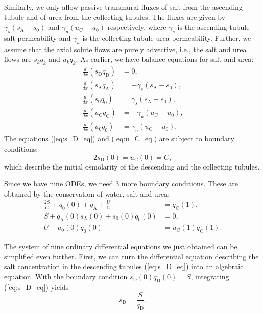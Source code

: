 \documentclass{article}
\numberwithin{equation}{section} %
\begin{document}
Similarly, we only allow passive transmural fluxes of salt from the ascending tubule and of urea from the collecting tubules.
The fluxes are given by $\gamma_s(s_\mathrm{A} - s_0)$ and $\gamma_u(u_\mathrm{C} - u_0)$ respectively, where $\gamma_s$ is the ascending tubule salt permeability and $\gamma_u$ is the collecting tubule urea permeability.
Further, we assume that the axial solute flows are purely advective, i.e., the salt and urea flows are $s_kq_k$ and $u_kq_k$.
As earlier, we have balance equations for salt and urea:
\begin{align}
    \frac{d}{dx}(s_\mathrm{D}q_\mathrm{D}) &= 0,\label{eq:s_D_eq}\\
    \frac{d}{dx}(s_\mathrm{A}q_\mathrm{A}) &= -\gamma_s(s_\mathrm{A} - s_0),\label{eq:s_A_eq}\\
    \frac{d}{dx}(s_\mathrm{0}q_\mathrm{0}) &= \gamma_s(s_\mathrm{A} - s_0),\label{eq:s_0_eq}\\
    \frac{d}{dx}(u_\mathrm{C}q_\mathrm{C}) &= -\gamma_u(u_\mathrm{C} - u_0),\label{eq:u_C_eq}\\
    \frac{d}{dx}(u_\mathrm{0}q_\mathrm{0}) &= \gamma_u(u_\mathrm{C} - u_0).\label{eq:u_0_eq}
\end{align}
The equations (\ref{eq:s_D_eq}) and (\ref{eq:u_C_eq}) are subject to boundary conditions:
\begin{equation}\label{eq:solute_bdry}
    2s_\mathrm{D}(0) = u_\mathrm{C}(0) = C,
\end{equation}
    which describe the initial osmolarity of the descending and the collecting tubules.

Since we have nine ODEs, we need 3 more boundary conditions.
These are obtained by the conservation of water, salt and urea:
\begin{align}
    \frac{2S}{C}+q_0(0)+q_\mathrm{A}+\frac{U}{C} &= q_\mathrm{C}(1),\label{eq:w_consv}\\
    S+q_\mathrm{A}(0)s_\mathrm{A}(0)+s_0(0)q_0(0) &= 0,\label{eq:s_consv}\\
    U+u_0(0)q_0(0) &= u_\mathrm{C}(1)q_\mathrm{C}(1).\label{eq:u_consv}
\end{align}

The system of nine ordinary differential equations we just obtained can be simplified even further.
First, we can turn the differential equation describing the salt concentration in the descending tubules (\ref{eq:s_D_eq}) into an algebraic equation.
With the boundary condition $s_\mathrm{D}(0)q_\mathrm{D}(0) = S$, integrating (\ref{eq:s_D_eq}) yields
\begin{equation}\label{eq:s_D}
    s_\mathrm{D} = \frac{S}{q_\mathrm{D}}.
\end{equation}
\end{document}
